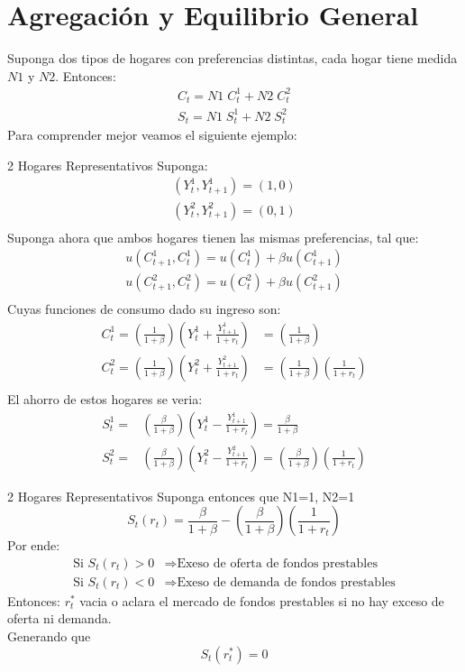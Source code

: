 \documentclass[12pt]{article}
\begin{document}
\section{Agregación y Equilibrio General}
Suponga dos tipos de hogares con preferencias distintas, cada hogar tiene medida $N1$ y $N2$. 
Entonces: 
\begin{align*}
    C_t=N1\;C_t^1+N2\;C_t^2\\
    S_t=N1\;S_t^1+N2\;S_t^2
\end{align*}
Para comprender mejor veamos el siguiente ejemplo: 
\begin{ejemplo}{2 Hogares Representativos}
    Suponga: 
    \begin{align*}
        (Y_t^1,Y_{t+1}^1)=(1,0)\\
        (Y_t^2,Y_{t+1}^2)=(0,1)\\
    \end{align*}
    Suponga ahora que ambos hogares tienen las mismas preferencias, tal que: 
    \begin{align*}
        u(C_{t+1}^1,C_t^1)=u(C_t^1)+\beta u(C_{t+1}^1)\\
        u(C_{t+1}^2,C_t^2)=u(C_t^2)+\beta u(C_{t+1}^2)\\
    \end{align*}
    Cuyas funciones de consumo dado su ingreso son: 
    \begin{align*}
        C_t^1=(\frac{1}{1+\beta})(Y_t^1+\frac{Y_{t+1}^1}{1+r_t})&=(\frac{1}{1+\beta})\\
        C_t^2=(\frac{1}{1+\beta})(Y_t^2+\frac{Y_{t+1}^2}{1+r_t})& =(\frac{1}{1+\beta})(\frac{1}{1+r_t})\\
    \end{align*}
    El ahorro de estos hogares se veria: 
    \begin{align*}
        S_t^1=&(\frac{\beta}{1+\beta})(Y_t^1-\frac{Y_{t+1}^1}{1+r_t})=\frac{\beta}{1+\beta}\\
        S_t^2=&(\frac{\beta}{1+\beta})(Y_t^2-\frac{Y_{t+1}^2}{1+r_t})=(\frac{\beta}{1+\beta})(\frac{1}{1+r_t})
    \end{align*}
\end{ejemplo}
\begin{ejemplo}{2 Hogares Representativos}
    Suponga entonces que N1=1, N2=1\\
    $$S_t(r_t)=\frac{\beta}{1+\beta}-(\frac{\beta}{1+\beta})(\frac{1}{1+r_t})$$
    Por ende: \\
\begin{equation}
    \begin{array}{cc}
            \text{Si } S_t(r_t)>0 & \Rightarrow{} \text{Exeso de oferta de fondos prestables}  \\
            \text{Si } S_t(r_t)<0  & \Rightarrow{} \text{Exeso de demanda de fondos prestables} 
    \end{array}
\end{equation}
    Entonces: $r_t^*$ vacia o aclara el mercado de fondos prestables si no hay exceso de oferta ni demanda. \\
    Generando que $$S_t(r_t^*)=0$$
\end{ejemplo}
\newpage
\end{document}
